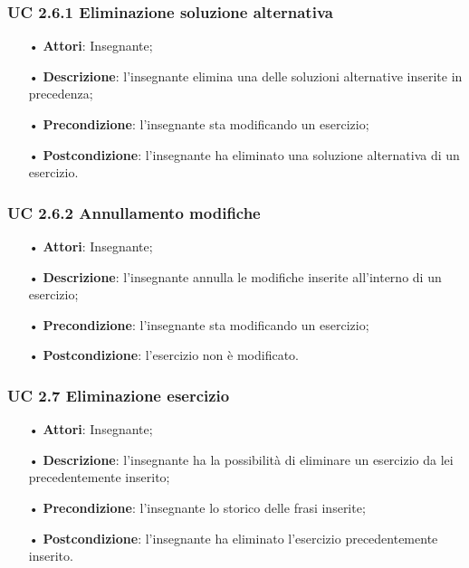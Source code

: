 \subsubsection{UC 2.6.1 Eliminazione soluzione alternativa}
\begin{itemize}
	\item[•] \textbf{Attori}: Insegnante;
	\item[•] \textbf{Descrizione}: l'insegnante elimina una delle soluzioni alternative inserite in precedenza;
	\item[•] \textbf{Precondizione}: l'insegnante sta modificando un esercizio;
	\item[•] \textbf{Postcondizione}: l'insegnante ha eliminato una soluzione alternativa di un esercizio.
\end{itemize}

\subsubsection{UC 2.6.2 Annullamento modifiche}
\begin{itemize}
	\item[•] \textbf{Attori}: Insegnante;
	\item[•] \textbf{Descrizione}: l'insegnante annulla le modifiche inserite all'interno di un esercizio; 
	\item[•] \textbf{Precondizione}: l'insegnante sta modificando un esercizio;
	\item[•] \textbf{Postcondizione}: l'esercizio non è modificato.
\end{itemize}


 
\subsubsection{UC 2.7 Eliminazione esercizio}
\begin{itemize}
	\item[•] \textbf{Attori}: Insegnante;
	\item[•] \textbf{Descrizione}: l'insegnante ha la possibilità di eliminare un esercizio da lei precedentemente inserito;
	\item[•] \textbf{Precondizione}: l'insegnante lo storico delle frasi inserite;
	\item[•] \textbf{Postcondizione}: l'insegnante ha eliminato l'esercizio precedentemente inserito.
\end{itemize}